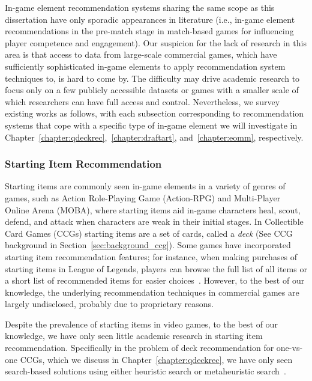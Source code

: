 
In-game element recommendation systems sharing the same scope as this dissertation have only sporadic appearances in literature (i.e., in-game element recommendations in the pre-match stage in match-based games for influencing player competence and engagement). Our suspicion for the lack of research in this area is that access to data from large-scale commercial games, which have sufficiently sophisticated in-game elements to apply recommendation system techniques to, is hard to come by. The difficulty may drive academic research to focus only on a few publicly accessible datasets or games with a smaller scale of which researchers can have full access and control. Nevertheless, we survey existing works as follows, with each subsection corresponding to recommendation systems that cope with a specific type of in-game element we will investigate in Chapter~\ref{chapter:qdeckrec},~\ref{chapter:draftart}, and~\ref{chapter:eomm}, respectively.


\subsubsection{Starting Item Recommendation}\label{sec:rw_startitem}
Starting items are commonly seen in-game elements in a variety of genres of games, such as Action Role-Playing Game (Action-RPG) and Multi-Player Online Arena (MOBA), where starting items aid in-game characters heal, scout, defend, and attack when characters are weak in their initial stages. In Collectible Card Games (CCGs) starting items are a set of cards, called a \textit{deck} (See CCG background in  Section~\ref{sec:background_ccg}). Some games have incorporated starting item recommendation features; for instance, when making purchases of starting items in League of Legends, players can browse the full list of all items or a short list of recommended items for easier choices~\citep{lol_recomitem}. However, to the best of our knowledge, the underlying recommendation techniques in commercial games are largely undisclosed, probably due to proprietary reasons.

Despite the prevalence of starting items in video games, to the best of our knowledge, we have only seen little academic research in starting item recommendation. Specifically in the problem of deck recommendation for one-vs-one CCGs, which we discuss in Chapter~\ref{chapter:qdeckrec}, we have only seen search-based solutions using either heuristic search or metaheuristic search~\citep{birattari2009tuning}.

